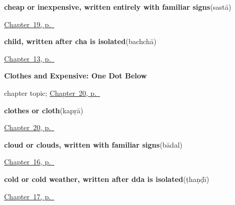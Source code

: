 \noindent\begin{minipage}[t]{\linewidth}
\raggedright
\textbf{cheap or inexpensive, written entirely with familiar signs}\enspace\emph{}\enspace(sastā)\par
\footnotesize \hyperref[ch:mw-shopping-five]{Chapter~19, p.~\pageref*{ch:mw-shopping-five}}
\end{minipage}\par\smallskip

\noindent\begin{minipage}[t]{\linewidth}
\raggedright
\textbf{child, written after cha is isolated}\enspace\emph{}\enspace(bachchā)\par
\footnotesize \hyperref[ch:mw-family-twelve]{Chapter~13, p.~\pageref*{ch:mw-family-twelve}}
\end{minipage}\par\smallskip

\noindent\begin{minipage}[t]{\linewidth}
\raggedright
\textbf{Clothes and Expensive: One Dot Below}\par
\footnotesize chapter topic; \hyperref[ch:mw-shopping-seven]{Chapter~20, p.~\pageref*{ch:mw-shopping-seven}}
\end{minipage}\par\smallskip

\noindent\begin{minipage}[t]{\linewidth}
\raggedright
\textbf{clothes or cloth}\enspace\emph{}\enspace(kapṛā)\par
\footnotesize \hyperref[ch:mw-shopping-seven]{Chapter~20, p.~\pageref*{ch:mw-shopping-seven}}
\end{minipage}\par\smallskip

\noindent\begin{minipage}[t]{\linewidth}
\raggedright
\textbf{cloud or clouds, written with familiar signs}\enspace\emph{}\enspace(bādal)\par
\footnotesize \hyperref[ch:mw-weather-three]{Chapter~16, p.~\pageref*{ch:mw-weather-three}}
\end{minipage}\par\smallskip

\noindent\begin{minipage}[t]{\linewidth}
\raggedright
\textbf{cold or cold weather, written after dda is isolated}\enspace\emph{}\enspace(ṭhaṇḍī)\par
\footnotesize \hyperref[ch:mw-weather-six]{Chapter~17, p.~\pageref*{ch:mw-weather-six}}
\end{minipage}\par\smallskip

